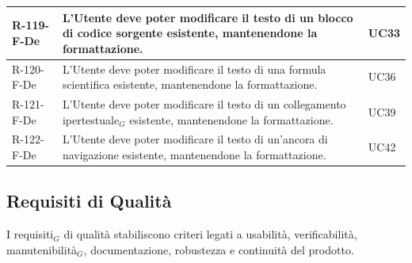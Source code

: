 \documentclass[a4paper, 10pt]{article}
\begin{document}
\begin{longtable}{|p{2.2cm}|p{7.5cm}|p{4cm}|}
R-119-F-De & L'Utente deve poter modificare il testo di un blocco di codice sorgente esistente, mantenendone la formattazione. & UC33 \\ \hline

R-120-F-De & L'Utente deve poter modificare il testo di una formula scientifica esistente, mantenendone la formattazione. & UC36 \\ \hline

R-121-F-De & L'Utente deve poter modificare il testo di un collegamento ipertestuale$_G$ esistente, mantenendone la formattazione. & UC39 \\ \hline

R-122-F-De & L'Utente deve poter modificare il testo di un'ancora di navigazione esistente, mantenendone la formattazione. & UC42 \\ \hline

\end{longtable}
\endgroup

\newcommand{\fonteCapitolato}[1]{\href{https://www.math.unipd.it/~tullio/IS-1/2025/Progetto/C6.pdf}{Capitolato$_G$ di progetto}}
\newcommand{\fonteInterna}[1]{Interna}

\subsection{Requisiti di Qualità}

I requisiti$_G$ di qualità stabiliscono criteri legati a usabilità, verificabilità, manutenibilità$_G$, documentazione, robustezza e continuità del prodotto.
\end{document}

